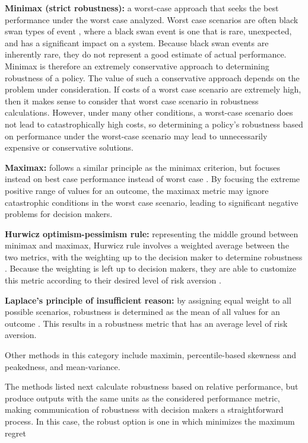 \textbf{Minimax (strict robustness):} a worst-case approach that seeks the best performance under the worst case analyzed. Worst case scenarios are often black swan types of event \citep{Taleb2007}, where a black swan event is one that is rare, unexpected, and has a significant impact on a system. Because black swan events are inherently rare, they do not represent a good estimate of actual performance. Minimax is therefore an extremely conservative approach to determining robustness of a policy. The value of such a conservative approach depends on the problem under consideration. If costs of a worst case scenario are extremely high, then it makes sense to consider that worst case scenario in robustness calculations. However, under many other conditions, a worst-case scenario does not lead to catastrophically high costs, so determining a policy's robustness based on performance under the worst-case scenario may lead to unnecessarily expensive or conservative solutions. 

\textbf{Maximax:} follows a similar principle as the minimax criterion, but focuses instead on best case performance instead of worst case \cite{McPhail2018, Rosenhead1972}. By focusing the extreme positive range of values for an outcome, the maximax metric may ignore catastrophic conditions in the worst case scenario, leading to significant negative problems for decision makers. 

\textbf{Hurwicz optimism-pessimism rule:} representing the middle ground between minimax and maximax, Hurwicz rule involves a weighted average between the two metrics, with the weighting up to the decision maker to determine robustness \citep{Rosenhead1972}. Because the weighting is left up to decision makers, they are able to customize this metric according to their desired level of risk aversion \citep{McPhail2018}. 

\textbf{Laplace's principle of insufficient reason:} by assigning equal weight to all possible scenarios, robustness is determined as the mean of all values for an outcome \citep{Rosenhead1972}. This results in a robustness metric that has an average level of risk aversion. 

Other methods in this category include maximin, percentile-based skewness and peakedness, and mean-variance. 

The methods listed next calculate robustness based on relative performance, but produce outputs with the same units as the considered performance metric, making communication of robustness with decision makers a straightforward process. In this case, the robust option is one in which minimizes the maximum regret \citep{McPhail2018}

